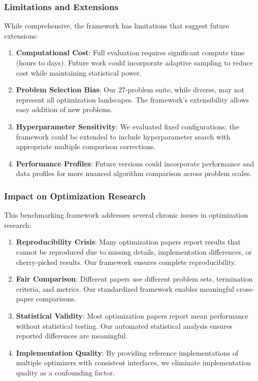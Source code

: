 \hypertarget{limitations-and-extensions}{%
\subsubsection{Limitations and Extensions}\label{limitations-and-extensions}}

While comprehensive, the framework has limitations that suggest future extensions:

\begin{enumerate}
\def\labelenumi{\arabic{enumi}.}
\tightlist
\item
  \textbf{Computational Cost}: Full evaluation requires significant compute time (hours to days). Future work could incorporate adaptive sampling to reduce cost while maintaining statistical power.
\item
  \textbf{Problem Selection Bias}: Our 27-problem suite, while diverse, may not represent all optimization landscapes. The framework's extensibility allows easy addition of new problems.
\item
  \textbf{Hyperparameter Sensitivity}: We evaluated fixed configurations; the framework could be extended to include hyperparameter search with appropriate multiple comparison corrections.
\item
  \textbf{Performance Profiles}: Future versions could incorporate performance and data profiles for more nuanced algorithm comparison across problem scales.
\end{enumerate}

\hypertarget{impact-on-optimization-research}{%
\subsubsection{Impact on Optimization Research}\label{impact-on-optimization-research}}

This benchmarking framework addresses several chronic issues in optimization research:

\begin{enumerate}
\def\labelenumi{\arabic{enumi}.}
\tightlist
\item
  \textbf{Reproducibility Crisis}: Many optimization papers report results that cannot be reproduced due to missing details, implementation differences, or cherry-picked results. Our framework ensures complete reproducibility.
\item
  \textbf{Fair Comparison}: Different papers use different problem sets, termination criteria, and metrics. Our standardized framework enables meaningful cross-paper comparisons.
\item
  \textbf{Statistical Validity}: Most optimization papers report mean performance without statistical testing. Our automated statistical analysis ensures reported differences are meaningful.
\item
  \textbf{Implementation Quality}: By providing reference implementations of multiple optimizers with consistent interfaces, we eliminate implementation quality as a confounding factor.
\end{enumerate}

